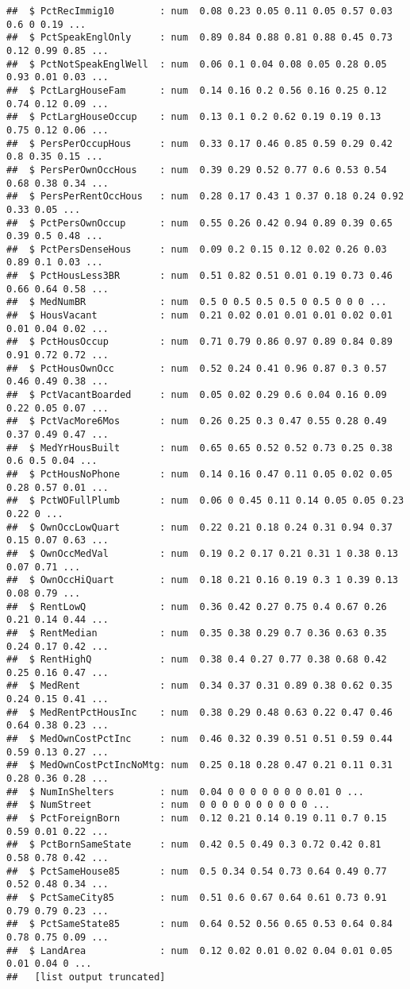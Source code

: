 \documentclass[
]{article}
\begin{document}
\begin{verbatim}
##  $ PctRecImmig10        : num  0.08 0.23 0.05 0.11 0.05 0.57 0.03 0.6 0 0.19 ...
##  $ PctSpeakEnglOnly     : num  0.89 0.84 0.88 0.81 0.88 0.45 0.73 0.12 0.99 0.85 ...
##  $ PctNotSpeakEnglWell  : num  0.06 0.1 0.04 0.08 0.05 0.28 0.05 0.93 0.01 0.03 ...
##  $ PctLargHouseFam      : num  0.14 0.16 0.2 0.56 0.16 0.25 0.12 0.74 0.12 0.09 ...
##  $ PctLargHouseOccup    : num  0.13 0.1 0.2 0.62 0.19 0.19 0.13 0.75 0.12 0.06 ...
##  $ PersPerOccupHous     : num  0.33 0.17 0.46 0.85 0.59 0.29 0.42 0.8 0.35 0.15 ...
##  $ PersPerOwnOccHous    : num  0.39 0.29 0.52 0.77 0.6 0.53 0.54 0.68 0.38 0.34 ...
##  $ PersPerRentOccHous   : num  0.28 0.17 0.43 1 0.37 0.18 0.24 0.92 0.33 0.05 ...
##  $ PctPersOwnOccup      : num  0.55 0.26 0.42 0.94 0.89 0.39 0.65 0.39 0.5 0.48 ...
##  $ PctPersDenseHous     : num  0.09 0.2 0.15 0.12 0.02 0.26 0.03 0.89 0.1 0.03 ...
##  $ PctHousLess3BR       : num  0.51 0.82 0.51 0.01 0.19 0.73 0.46 0.66 0.64 0.58 ...
##  $ MedNumBR             : num  0.5 0 0.5 0.5 0.5 0 0.5 0 0 0 ...
##  $ HousVacant           : num  0.21 0.02 0.01 0.01 0.01 0.02 0.01 0.01 0.04 0.02 ...
##  $ PctHousOccup         : num  0.71 0.79 0.86 0.97 0.89 0.84 0.89 0.91 0.72 0.72 ...
##  $ PctHousOwnOcc        : num  0.52 0.24 0.41 0.96 0.87 0.3 0.57 0.46 0.49 0.38 ...
##  $ PctVacantBoarded     : num  0.05 0.02 0.29 0.6 0.04 0.16 0.09 0.22 0.05 0.07 ...
##  $ PctVacMore6Mos       : num  0.26 0.25 0.3 0.47 0.55 0.28 0.49 0.37 0.49 0.47 ...
##  $ MedYrHousBuilt       : num  0.65 0.65 0.52 0.52 0.73 0.25 0.38 0.6 0.5 0.04 ...
##  $ PctHousNoPhone       : num  0.14 0.16 0.47 0.11 0.05 0.02 0.05 0.28 0.57 0.01 ...
##  $ PctWOFullPlumb       : num  0.06 0 0.45 0.11 0.14 0.05 0.05 0.23 0.22 0 ...
##  $ OwnOccLowQuart       : num  0.22 0.21 0.18 0.24 0.31 0.94 0.37 0.15 0.07 0.63 ...
##  $ OwnOccMedVal         : num  0.19 0.2 0.17 0.21 0.31 1 0.38 0.13 0.07 0.71 ...
##  $ OwnOccHiQuart        : num  0.18 0.21 0.16 0.19 0.3 1 0.39 0.13 0.08 0.79 ...
##  $ RentLowQ             : num  0.36 0.42 0.27 0.75 0.4 0.67 0.26 0.21 0.14 0.44 ...
##  $ RentMedian           : num  0.35 0.38 0.29 0.7 0.36 0.63 0.35 0.24 0.17 0.42 ...
##  $ RentHighQ            : num  0.38 0.4 0.27 0.77 0.38 0.68 0.42 0.25 0.16 0.47 ...
##  $ MedRent              : num  0.34 0.37 0.31 0.89 0.38 0.62 0.35 0.24 0.15 0.41 ...
##  $ MedRentPctHousInc    : num  0.38 0.29 0.48 0.63 0.22 0.47 0.46 0.64 0.38 0.23 ...
##  $ MedOwnCostPctInc     : num  0.46 0.32 0.39 0.51 0.51 0.59 0.44 0.59 0.13 0.27 ...
##  $ MedOwnCostPctIncNoMtg: num  0.25 0.18 0.28 0.47 0.21 0.11 0.31 0.28 0.36 0.28 ...
##  $ NumInShelters        : num  0.04 0 0 0 0 0 0 0 0.01 0 ...
##  $ NumStreet            : num  0 0 0 0 0 0 0 0 0 0 ...
##  $ PctForeignBorn       : num  0.12 0.21 0.14 0.19 0.11 0.7 0.15 0.59 0.01 0.22 ...
##  $ PctBornSameState     : num  0.42 0.5 0.49 0.3 0.72 0.42 0.81 0.58 0.78 0.42 ...
##  $ PctSameHouse85       : num  0.5 0.34 0.54 0.73 0.64 0.49 0.77 0.52 0.48 0.34 ...
##  $ PctSameCity85        : num  0.51 0.6 0.67 0.64 0.61 0.73 0.91 0.79 0.79 0.23 ...
##  $ PctSameState85       : num  0.64 0.52 0.56 0.65 0.53 0.64 0.84 0.78 0.75 0.09 ...
##  $ LandArea             : num  0.12 0.02 0.01 0.02 0.04 0.01 0.05 0.01 0.04 0 ...
##   [list output truncated]
\end{verbatim}
\end{document}
